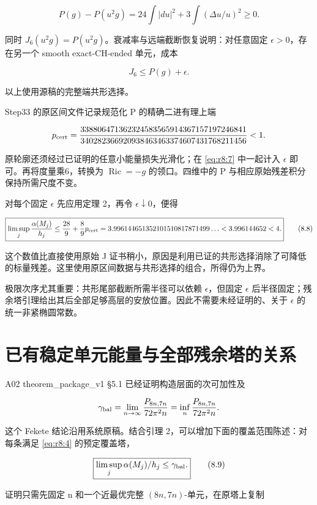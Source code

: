 \documentclass[UTF8,11pt,openany,oneside,fontset=none]{ctexbook}
\begin{document}
\[
P(g)-P(u^2g)
=24\int|du|^2+3\int(\Delta u/u)^2\ge0.
\]

同时 \(J_6(u^2g)=P(u^2g)\)。衰减率与远端截断恢复说明：对任意固定 \(\epsilon>0\)，存在另一个 smooth exact-CH-ended 单元，成本

\[
J_6\le P(g)+\epsilon.
\tag{8.7}\label{eq:r8:7}
\]

以上使用源稿的完整端共形选择。

Step33 的原区间文件记录规范化 P 的精确二进有理上端

\[
p_{\rm cert}=
\frac{338806471362324583565914367157197246841}
{340282366920938463463374607431768211456}
<1.
\]

原轮廓还须经过已证明的任意小能量损失光滑化；在 \eqref{eq:r8:7} 中一起计入 \(\epsilon\) 即可。再将度量乘6，转换为 \(\operatorname{Ric}=-g\) 的领口。四维中的 P 与相应原始残差积分保持所需尺度不变。

对每个固定 \(\epsilon\) 先应用定理 2，再令 \(\epsilon\downarrow0\)，便得

\[
\boxed{
\limsup_j\frac{\alpha(M_j)}{h_j}
\le\frac{28}{9}+\frac89p_{\rm cert}
=3.996144651352101510817871499\ldots
<3.996144652<4.
}
\tag{8.8}\label{eq:r8:8}
\]

这个数值比直接使用原始 J 证书稍小，原因是利用已证的共形选择消除了可降低的标量残差。这里使用原区间数据与共形选择的组合，所得仍为上界。

极限次序尤其重要：共形尾部截断所需半径可以依赖 \(\epsilon\)，但固定 \(\epsilon\) 后半径固定；残余塔引理给出其后全部足够高层的安放位置。因此不需要未经证明的、关于 \(\epsilon\) 的统一非紧椭圆常数。

\section{已有稳定单元能量与全部残余塔的关系}\label{ch8:ux5df2ux6709ux7a33ux5b9aux5355ux5143ux80fdux91cfux4e0eux5168ux90e8ux6b8bux4f59ux5854ux7684ux5173ux7cfb}

A02 theorem\_package\_v1 §5.1 已经证明构造层面的次可加性及

\[
\gamma_{\rm bal}
=\lim_{n\to\infty}\frac{\mathfrak P_{8n,7n}}{72\pi^2n}
=\inf_n\frac{\mathfrak P_{8n,7n}}{72\pi^2n}.
\]

这个 Fekete 结论沿用系统原稿。结合引理 2，可以增加下面的覆盖范围陈述：对每条满足 \eqref{eq:r8:4} 的预定覆盖塔，

\[
\boxed{\limsup_j\alpha(M_j)/h_j\le\gamma_{\rm bal}.}
\tag{8.9}\label{eq:r8:9}
\]

证明只需先固定 n 和一个近最优完整 \((8n,7n)\)-单元，在原塔上复制
\end{document}
